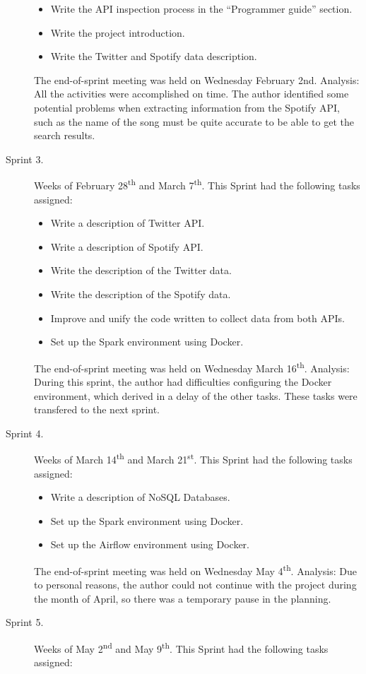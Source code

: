 \begin{description}
\begin{itemize}
		\item Write the API inspection process in the ``Programmer guide'' section.
		\item Write the project introduction.
		\item Write the Twitter and Spotify data description.
	\end{itemize}
	The end-of-sprint meeting was held on Wednesday February 2nd. Analysis: All the activities were accomplished on time. The author identified some potential problems when extracting information from the Spotify API, such as the name of the song must be quite accurate to be able to get the search results.
	\item[Sprint 3.] Weeks of February 28\textsuperscript{th} and March 7\textsuperscript{th}. This Sprint had the following tasks assigned:
	\begin{itemize}		
		\item Write a description of Twitter API.
		\item Write a description of Spotify API.
		\item Write the description of the Twitter data.
		\item Write the description of the Spotify data.
		\item Improve and unify the code written to collect data from both APIs.
		\item Set up the Spark environment using Docker.
	\end{itemize}
	The end-of-sprint meeting was held on Wednesday March 16\textsuperscript{th}. Analysis: During this sprint, the author had difficulties configuring the Docker environment, which derived in a delay of the other tasks. These tasks were transfered to the next sprint.
	\item[Sprint 4.] Weeks of March 14\textsuperscript{th} and March 21\textsuperscript{st}. This Sprint had the following tasks assigned:
	\begin{itemize}
		\item Write a description of NoSQL Databases.
		\item Set up the Spark environment using Docker.
		\item Set up the Airflow environment using Docker.
	\end{itemize}
	The end-of-sprint meeting was held on Wednesday May 4\textsuperscript{th}. Analysis: Due to personal reasons, the author could not continue with the project during the month of April, so there was a temporary pause in the planning.
	\item[Sprint 5.] Weeks of May 2\textsuperscript{nd} and May 9\textsuperscript{th}. This Sprint had the following tasks assigned:

\end{description}
